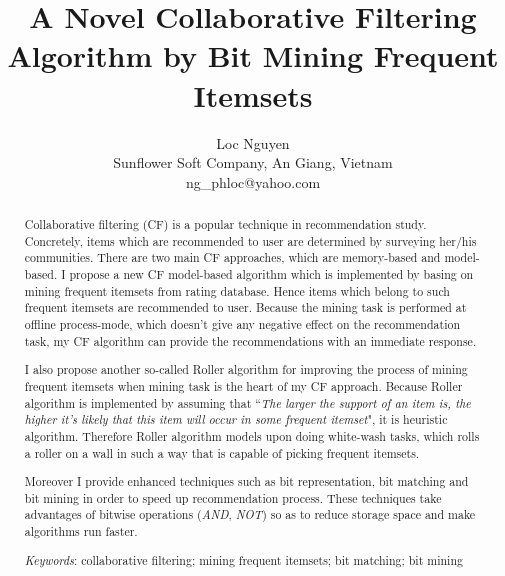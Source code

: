 \documentclass{article}
\begin{document}
\title{A Novel Collaborative Filtering Algorithm by Bit Mining Frequent Itemsets}

\author{
Loc Nguyen\\
Sunflower Soft Company, An Giang, Vietnam\\
ng\_phloc@yahoo.com
}

\maketitle

\begin{abstract}
Collaborative filtering (CF) is a popular technique in recommendation study. Concretely, items which are recommended to user are determined by surveying her/his communities. There are two main CF approaches, which are memory-based and model-based. I propose a new CF model-based algorithm which is implemented by basing on mining frequent itemsets from rating database. Hence items which belong to such frequent itemsets are recommended to user. Because the mining task is performed at offline process-mode, which doesn't give any negative effect on the recommendation task, my CF algorithm can provide the recommendations with an immediate response.

I also propose another so-called Roller algorithm for improving the process of mining frequent itemsets when mining task is the heart of my CF approach. Because Roller algorithm is implemented by assuming that ``\textit{The larger the support of an item is, the higher it's likely that this item will occur in some frequent itemset}", it is heuristic algorithm. Therefore Roller algorithm models upon doing white-wash tasks, which rolls a roller on a wall in such a way that is capable of picking frequent itemsets.

Moreover I provide enhanced techniques such as bit representation, bit matching and bit mining in order to speed up recommendation process. These techniques take advantages of bitwise operations (\textit{AND}, \textit{NOT}) so as to reduce storage space and make algorithms run faster.

\textit{Keywords}: collaborative filtering; mining frequent itemsets; bit matching; bit mining
\end{abstract}
\end{document}
